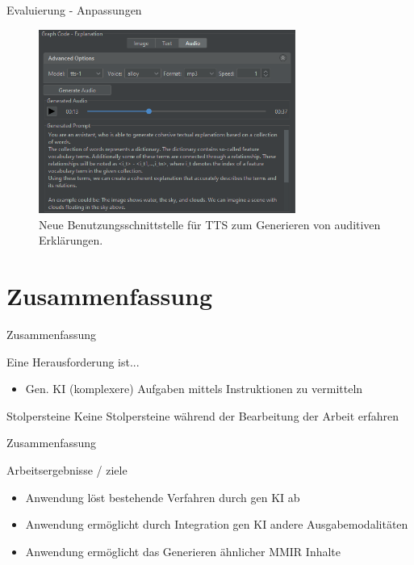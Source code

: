 \documentclass[t]{beamer}
\begin{document}
\begin{frame}{Evaluierung - Anpassungen}

  \begin{figure}
    \includegraphics[width=0.75\textwidth]{images/right_audio_exp}
    \caption{Neue Benutzungsschnittstelle für TTS zum Generieren von auditiven Erklärungen.}
  \end{figure}

\end{frame}

\section{Zusammenfassung}

\begin{frame}{Zusammenfassung}

  \begin{block}{Eine Herausforderung ist...}
    \begin{itemize}
      \item Gen. KI (komplexere) Aufgaben mittels Instruktionen zu vermitteln
    \end{itemize}
  \end{block}

  \begin{block}{Stolpersteine}
    Keine Stolpersteine während der Bearbeitung der Arbeit erfahren
  \end{block}

\end{frame}

\begin{frame}{Zusammenfassung}

  \begin{exampleblock}{Arbeitsergebnisse / ziele}
    \begin{itemize}
      \item Anwendung löst bestehende Verfahren durch gen KI ab
      \item Anwendung ermöglicht durch Integration gen KI andere Ausgabemodalitäten
      \item Anwendung ermöglicht das Generieren ähnlicher MMIR Inhalte
    \end{itemize}
  \end{exampleblock}

\end{frame}
\end{document}
